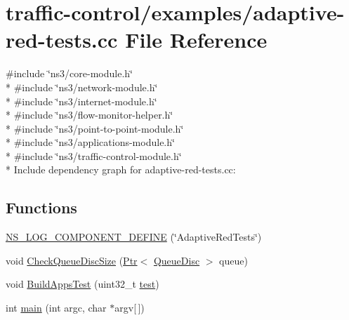 \hypertarget{adaptive-red-tests_8cc}{}\section{traffic-\/control/examples/adaptive-\/red-\/tests.cc File Reference}
\label{adaptive-red-tests_8cc}
{\ttfamily \#include \char`\"{}ns3/core-\/module.\+h\char`\"{}}\\*
{\ttfamily \#include \char`\"{}ns3/network-\/module.\+h\char`\"{}}\\*
{\ttfamily \#include \char`\"{}ns3/internet-\/module.\+h\char`\"{}}\\*
{\ttfamily \#include \char`\"{}ns3/flow-\/monitor-\/helper.\+h\char`\"{}}\\*
{\ttfamily \#include \char`\"{}ns3/point-\/to-\/point-\/module.\+h\char`\"{}}\\*
{\ttfamily \#include \char`\"{}ns3/applications-\/module.\+h\char`\"{}}\\*
{\ttfamily \#include \char`\"{}ns3/traffic-\/control-\/module.\+h\char`\"{}}\\*
Include dependency graph for adaptive-\/red-\/tests.cc\+:
\subsection*{Functions}
\begin{DoxyCompactItemize}
\item 
\hyperlink{adaptive-red-tests_8cc_ac25688e23dcd99ad74a29ea6fde9a015}{N\+S\+\_\+\+L\+O\+G\+\_\+\+C\+O\+M\+P\+O\+N\+E\+N\+T\+\_\+\+D\+E\+F\+I\+NE} (\char`\"{}Adaptive\+Red\+Tests\char`\"{})
\item 
void \hyperlink{adaptive-red-tests_8cc_a64451d920062e967d2c0fa8b6ae85911}{Check\+Queue\+Disc\+Size} (\hyperlink{classns3_1_1Ptr}{Ptr}$<$ \hyperlink{classns3_1_1QueueDisc}{Queue\+Disc} $>$ queue)
\item 
void \hyperlink{adaptive-red-tests_8cc_a10c553e45f82b05b5cb70aaa433308b0}{Build\+Apps\+Test} (uint32\+\_\+t \hyperlink{main-test-sync_8cc_a708a4c1a4d0c4acc4c447310dd4db27f}{test})
\item 
int \hyperlink{adaptive-red-tests_8cc_a0ddf1224851353fc92bfbff6f499fa97}{main} (int argc, char $\ast$argv\mbox{[}$\,$\mbox{]})
\end{DoxyCompactItemize}
